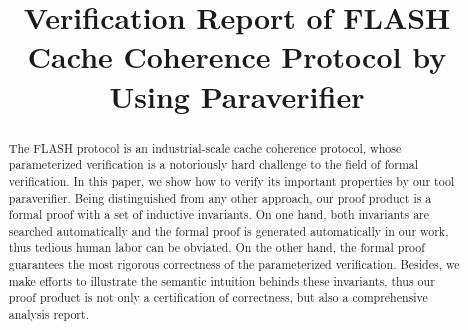 \documentclass{llncs}
\newcommand{\bedt}[1]{{\color{black}#1}}
\begin{document}
\title{ Verification Report  of FLASH Cache Coherence Protocol by Using Paraverifier}


\maketitle

\begin{abstract}
The FLASH protocol is an industrial-scale cache coherence protocol, whose parameterized verification is a notoriously hard challenge to the field of formal \bedt{verification}. In this paper, we show how to verify its important properties by our tool {\sf paraverifier}. Being distinguished from any other approach, our proof product is a formal  proof with a set of inductive invariants. %
\bedt{On one hand, both invariants are searched automatically and the formal proof is generated automatically in our work, thus tedious human labor can be obviated. On the other hand, the formal proof guarantees the most rigorous correctness of the parameterized verification. Besides, we make efforts to illustrate the semantic intuition behinds these invariants, thus our proof product is not only a certification of correctness, but also a comprehensive analysis report.}

\end{abstract}

\end{document}
